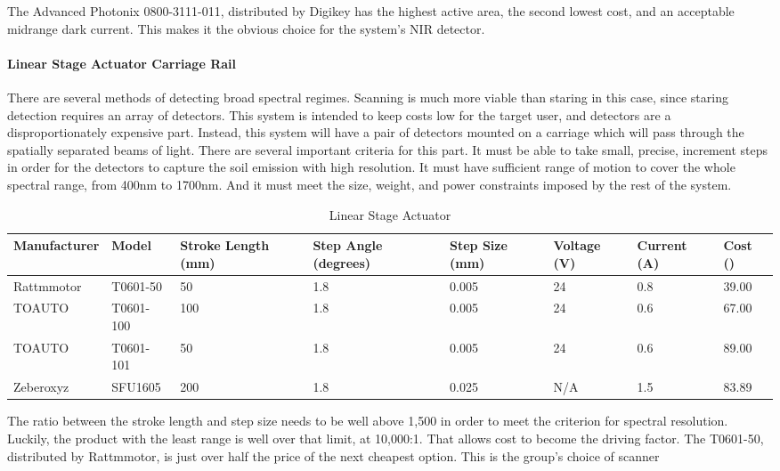 The Advanced Photonix 0800-3111-011, distributed by Digikey has the highest active area, the second lowest cost, and an acceptable midrange dark current. This makes it the obvious choice for the system’s NIR detector.

\paragraph{Linear Stage Actuator Carriage Rail}

There are several methods of detecting broad spectral regimes. Scanning is much more viable than staring in this case, since staring detection requires an array of detectors. This system is intended to keep costs low for the target user, and detectors are a disproportionately expensive part. Instead, this system will have a pair of detectors mounted on a carriage which will pass through the spatially separated beams of light. There are several important criteria for this part. It must be able to take small, precise, increment steps in order for the detectors to capture the soil emission with high resolution. It must have sufficient range of motion to cover the whole spectral range, from 400nm to 1700nm. And it must meet the size, weight, and power constraints imposed by the rest of the system. 


\begin{table}[H]
	\centering
	\label{table:LinearStageActuators}
	\caption{Linear Stage Actuator}
	\begin{tabular}{|l|l|l|l|l|l|l|l|}
	\hline
	Manufacturer & Model & Stroke Length (mm) & Step Angle (degrees) & Step Size (mm) & Voltage (V) & Current (A) & Cost (\textdollar)\\
	\hline
	Rattmmotor & T0601-50 & 50 & 1.8 & 0.005 & 24 & 0.8 & 39.00\\
	\hline
	TOAUTO & T0601-100 & 100 & 1.8 & 0.005 & 24 & 0.6 & 67.00\\
	\hline
	TOAUTO & T0601-101 & 50 & 1.8 & 0.005 & 24 & 0.6 & 89.00\\
	\hline
	Zeberoxyz & SFU1605 & 200 & 1.8 & 0.025 & N/A & 1.5 & 83.89\\
	\hline
	\end{tabular}
\end{table}

The ratio between the stroke length and step size needs to be well above 1,500 in order to meet the criterion for spectral resolution. Luckily, the product with the least range is well over that limit, at 10,000:1. That allows cost to become the driving factor. The T0601-50, distributed by Rattmmotor, is just over half the price of the next cheapest option. This is the group’s choice of scanner


